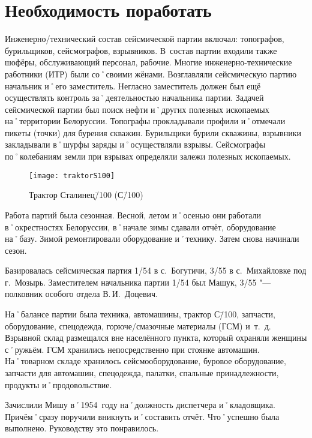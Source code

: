 ﻿\chapter{Необходимость поработать}

Инженерно\-/технический состав сейсмической партии включал: топографов, бурильщиков, сейсмографов, взрывников. В~состав партии входили также шофёры, обслуживающий персонал, рабочие. Многие инженерно-технические работники (ИТР) были со˚своими жёнами. Возглавляли сейсмическую партию начальник и˚его заместитель. Негласно заместитель должен был ещё осуществлять контроль за˚деятельностью начальника партии. Задачей сейсмической партии был поиск нефти и˚других полезных ископаемых на˚территории Белоруссии. Топографы прокладывали профили и˚отмечали пикеты (точки) для бурения скважин. Бурильщики бурили скважины, взрывники закладывали в˚шурфы заряды и˚осуществляли взрывы. Сейсмографы по˚колебаниям земли при взрывах определяли залежи полезных ископаемых.

\begin{wrapfigure}{O}{.4\textwidth}
\centering
\texttt{[image: traktorS100]}
\caption[Трактор Сталинец\=/100 (С\=/100)]{Трактор Сталинец\=/100 (С\=/100)\footnotemark}
\label{fig:traktorS100}
\end{wrapfigure}

Работа партий была сезонная. Весной, летом и˚осенью они работали в˚окрестностях Белоруссии, в˚начале зимы сдавали отчёт, оборудование на˚базу. Зимой ремонтировали оборудование и˚технику. Затем снова начинали сезон.

Базировалась сейсмическая партия 1/54 в с.~Богутичи, 3/55 в с.~Михайловке под г.~Мозырь. Заместителем начальника партии 1/54 был Машук, 3/55 "--- полковник особого отдела В.\,И.~Доцевич.

На˚балансе партии была техника, автомашины, трактор С\=/100, запчасти, оборудование, спецодежда, горюче\-/смазочные материалы (ГСМ) и~т.~д. Взрывной склад размещался вне населённого пункта, который охраняли женщины с˚ружьём. ГСМ хранились непосредственно при стоянке автомашин. На˚товарном складе хранилось сейсмооборудование, буровое оборудование, запчасти для автомашин, спецодежда, палатки, спальные принадлежности, продукты и˚продовольствие.

Зачислили Мишу в˚1954~году на˚должность диспетчера и˚кладовщика. Причём˚сразу поручили вникнуть и˚составить отчёт. Что˚успешно была выполнено. Руководству это понравилось.

